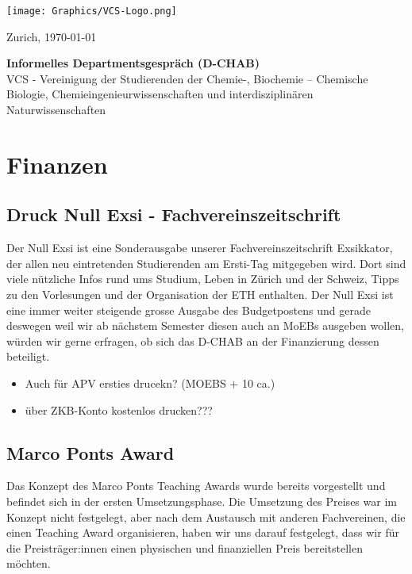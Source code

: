 \documentclass{article}
\begin{document}
\vspace{-4cm}
\texttt{[image: Graphics/VCS-Logo.png]}

\vspace{-1.5cm}
\begin{flushright}
\parbox[r]{5cm}{Zurich, \today}
\end{flushright}

\vspace{1.5cm}
\begin{center}
\textbf{\LARGE{Informelles Departmentsgespräch (D-CHAB)}} \\
\vspace{0.5cm}
\Large
VCS - Vereinigung der Studierenden der Chemie-, Biochemie – Chemische Biologie, 
Chemieingenieurwissenschaften und interdisziplinären Naturwissenschaften
\end{center}

\section{Finanzen}

\subsection{Druck Null Exsi - Fachvereinszeitschrift}
Der Null Exsi ist eine Sonderausgabe unserer Fachvereinszeitschrift Exsikkator, der allen neu eintretenden Studierenden am Ersti-Tag mitgegeben wird. Dort sind viele nützliche Infos rund ums Studium, Leben in Zürich und der Schweiz, Tipps zu den Vorlesungen und der Organisation der ETH enthalten. Der Null Exsi ist eine immer weiter steigende grosse Ausgabe des Budgetpostens und gerade deswegen weil wir ab nächstem Semester diesen auch an MoEBs ausgeben wollen, würden wir gerne erfragen, ob sich das D-CHAB an der Finanzierung dessen beteiligt. 
\begin{itemize}
    \item Auch für APV ersties drucekn? (MOEBS + 10 ca.)
    \item über ZKB-Konto kostenlos drucken???
\end{itemize}

\subsection{Marco Ponts Award}
Das Konzept des Marco Ponts Teaching Awards wurde bereits vorgestellt und befindet sich in der ersten Umsetzungsphase. Die Umsetzung des Preises war im Konzept nicht festgelegt, aber nach dem Austausch mit anderen Fachvereinen, die einen Teaching Award organisieren, haben wir uns darauf festgelegt, dass wir für die Preisträger:innen einen physischen und finanziellen Preis bereitstellen möchten. \\
\end{document}
